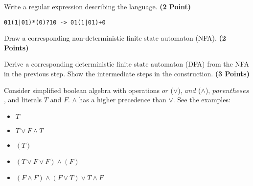 \documentclass [11pt, a4wide, twoside]{article}
\begin{document}
\begin{myenumerate}

\item Write a regular expression describing the language. \textbf{(2 Point)}\vspace{3cm}

\begin{solutionBlock}
\begin{verbatim}
01(1|01)*(0)?10 -> 01(1|01)+0
\end{verbatim}
\end{solutionBlock}

\item Draw a corresponding non-deterministic finite state automaton (NFA). \textbf{(2 Points)}\vspace{5cm}

\newpage
\item Derive a corresponding deterministic finite state automaton (DFA) from the NFA in the previous step. Show the intermediate steps in the construction. \textbf{(3 Points)}\vspace{5cm}

\end{myenumerate} 

% 
\newpage
{}
\noindent

Consider simplified boolean algebra with operations $or$ ($\lor$), $and$ ($\land$), $parentheses$, and literals $T$ and $F$.
$\land$ has a higher precedence than $\lor$.
See the examples:

\begin{itemize}
	\item $T$
	\item $T \lor F \land T$
	\item $(T)$
	\item $(T \lor F \lor F) \land (F)$
	\item $(F \land F) \land (F \lor T) \lor T \land F$
\end{itemize}
\end{document}
